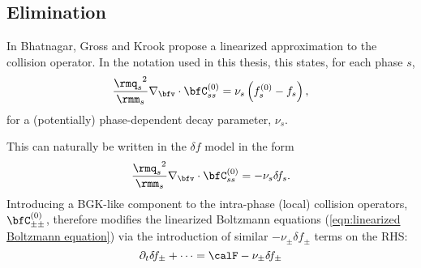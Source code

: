 \subsection*{Elimination}
    \begin{definition}
        In \cite{Bhatnagar_Gross_Krook_1954} Bhatnagar, Gross and Krook propose a linearized approximation to the collision operator. In the notation used in this thesis, this states, for each phase $s$,
        \begin{equation}
            \frac{{\rmq_{s}}^{2}}{\rmm_{s}}\nabla_{\bfv}\cdot\bfC_{ss}^{(0)}  =  \nu_{s}\left(f_{s}^{(0)} - f_{s}\right),
        \end{equation}
        for a (potentially) phase-dependent decay parameter, $\nu_{s}$.
    \end{definition}
    This can naturally be written in the $\delta\!f$ model in the form
    \begin{equation}
        \frac{{\rmq_{s}}^{2}}{\rmm_{s}}\nabla_{\bfv}\cdot\bfC_{ss}^{(0)}  =  - \nu_{s}\delta\!f_{s}.
     \end{equation}
    Introducing a BGK-like component to the intra-phase (local) collision operators, $\bfC_{\pm\pm}^{(0)}$, therefore modifies the linearized Boltzmann equations (\ref{eqn:linearized Boltzmann equation}) via the introduction of similar $- \nu_{\pm}\delta\!f_{\pm}$ terms on the RHS:
    \begin{equation}
        \partial_{t}\delta\!f_{\pm} + \cdots  =  \calF - \nu_{\pm}\delta\!f_{\pm}
    \end{equation}


    
